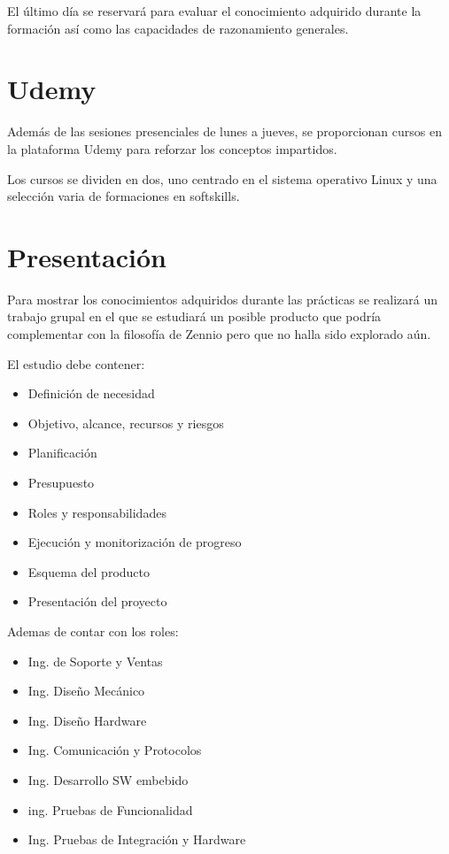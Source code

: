 El último día se reservará para evaluar el conocimiento adquirido durante la formación así como las capacidades de razonamiento generales.

\section*{Udemy}
\label{sec:udemy}

Además de las sesiones presenciales de lunes a jueves, se proporcionan cursos en la plataforma Udemy para reforzar los conceptos impartidos.

Los cursos se dividen en dos, uno centrado en el sistema operativo Linux y una selección varia de formaciones en softskills.

\section*{Presentación}
\label{sec:presentacion}

Para mostrar los conocimientos adquiridos durante las prácticas se realizará un trabajo grupal en el que se estudiará un posible producto que podría complementar con la filosofía de Zennio pero que no halla sido explorado aún.

El estudio debe contener:
\begin{itemize}
    \item Definición de necesidad
    \item Objetivo, alcance, recursos y riesgos
    \item Planificación
    \item Presupuesto
    \item Roles y responsabilidades
    \item Ejecución y monitorización de progreso
    \item Esquema del producto
    \item Presentación del proyecto
\end{itemize}

Ademas de contar con los roles:
\begin{itemize}
    \item Ing. de Soporte y Ventas
    \item Ing. Diseño Mecánico
    \item Ing. Diseño Hardware
    \item Ing. Comunicación y Protocolos
    \item Ing. Desarrollo SW embebido
    \item ing. Pruebas de Funcionalidad
    \item Ing. Pruebas de Integración y Hardware
\end{itemize}
